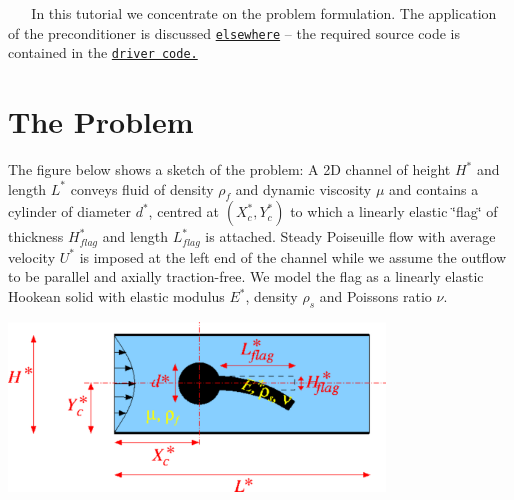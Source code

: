~\newline
~\newline
In this tutorial we concentrate on the problem formulation. The application of the preconditioner is discussed \href{../../../preconditioners/fsi/html/index.html}{\tt elsewhere} -- the required source code is contained in the \href{../../../../demo_drivers/interaction/turek_flag/turek_flag.cc}{\tt driver code.}



 

\hypertarget{index_the_problem}{}\section{The Problem}\label{index_the_problem}
The figure below shows a sketch of the problem\+: A 2D channel of height $ H^*$ and length $ L^* $ conveys fluid of density $ \rho_f $ and dynamic viscosity $ \mu $ and contains a cylinder of diameter $ d^* $, centred at $ (X^*_c, Y^*_c) $ to which a linearly elastic \char`\"{}flag\char`\"{} of thickness $ H^*_{flag}$ and length $ L^*_{flag} $ is attached. Steady Poiseuille flow with average velocity $ U^* $ is imposed at the left end of the channel while we assume the outflow to be parallel and axially traction-\/free. We model the flag as a linearly elastic Hookean solid with elastic modulus $ E^* $, density $ \rho_s $ and Poisson\textquotesingle{}s ratio $ \nu. $

 
\begin{DoxyImage}
\includegraphics[width=0.75\textwidth]{turek_flag_dim}
\end{DoxyImage}


